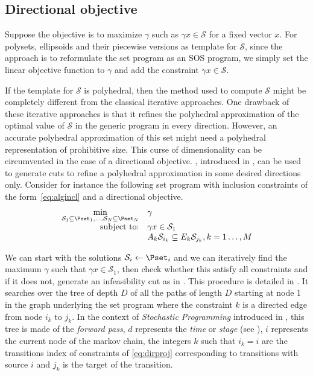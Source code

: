 \documentclass[11pt,twoside,a4paper,openright]{uclouvain-thesis}
\begin{document}
\subsection{Directional objective}
\label{sec:dirobj}

Suppose the objective is to maximize $\gamma$ such as $\gamma x \in \mathcal{S}$ for a fixed vector $x$.
For polysets, ellipsoids and their piecewise versions as template for $\mathcal{S}$,
since the approach is to
reformulate the set program as an SOS program, we simply set the linear objective function to $\gamma$ and add the constraint $\gamma x \in \mathcal{S}$.

If the template for $\mathcal{S}$ is polyhedral,
then the method used to compute $\mathcal{S}$ might be completely different from
the classical iterative approaches.
One drawback of these iterative approaches is that it refines the polyhedral
approximation of the optimal value of $\mathcal{S}$ in the generic program
in every direction.
However, an accurate polyhedral approximation of this set might need a polyhedral representation of prohibitive size.
This curse of dimensionality can be circumvented in the case of a directional objective.
, introduced in ,
can be used to generate cuts to refine a polyhedral approximation in some desired directions only.
Consider for instance the following set program with inclusion constraints of the form~\eqref{eq:algincl} and a directional objective.
\begin{equation}
  \label{eq:dirproj}
  \begin{array}{rl}
    \min\limits_{\mathcal{S}_1 \subseteq \Pset_1, \ldots, \mathcal{S}_N \subseteq \Pset_N} & \gamma\\
    \text{subject to:} & \gamma x \in \mathcal{S}_1\\
    & A_k \mathcal{S}_{i_k} \subseteq E_k \mathcal{S}_{j_k}, k = 1 \ldots, M\\
  \end{array}
\end{equation}

We can start with the solutions $\mathcal{S}_i \gets \Pset_i$ and
we can iteratively find the maximum $\gamma$ such that $\gamma x \in \mathcal{S}_1$,
then check whether this satisfy all constraints and if it does not, generate
an infeasibility cut as in .
This procedure is detailed in .
It searches over the tree of depth $D$ of all the paths of length $D$ starting at node 1 in the graph underlying the set program where the constraint $k$ is a directed edge from node $i_k$ to $j_k$.
In the context of \emph{Stochastic Programming} introduced in ,
this tree is made of the \emph{forward pass},
$d$ represents the \emph{time} or \emph{stage} (see ),
$i$ represents the current node of the markov chain,
the integers $k$ such that $i_k = i$ are the transitions index of constraints of \eqref{eq:dirproj} corresponding to transitions with source $i$
and $j_k$ is the target of the transition.
\end{document}
